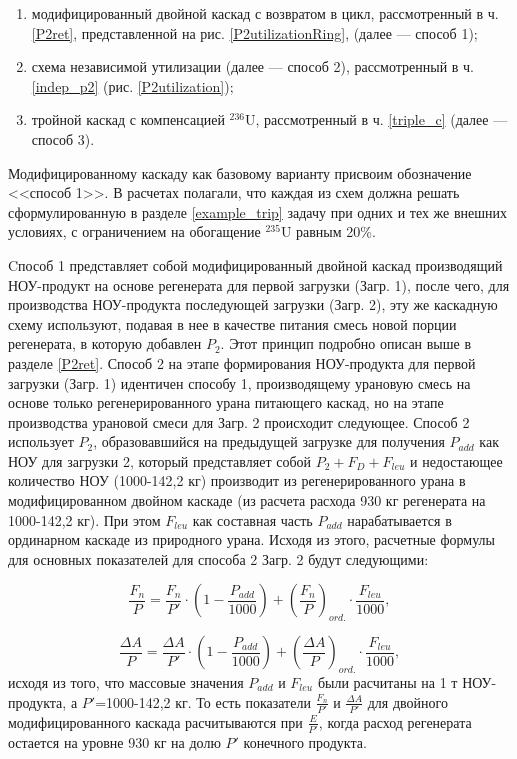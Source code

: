 \begin{enumerate}
    \item модифицированный двойной каскад с возвратом в цикл, рассмотренный в ч. \ref{P2ret}, представленной на рис. \ref{P2utilizationRing}, (далее --- способ 1);
    \item схема независимой утилизации (далее --- способ 2), рассмотренный в ч. \ref{indep_p2} (рис. \ref{P2utilization});
    \item тройной каскад с компенсацией $^{236}$U, рассмотренный в ч. \ref{triple_c} (далее --- способ 3).
\end{enumerate}

Модифицированному каскаду как базовому варианту присвоим обозначение <<способ 1>>. В расчетах полагали, что каждая из схем должна решать сформулированную в разделе \ref{example_trip} задачу при одних и тех же внешних условиях, с ограничением на обогащение $^{235}$U равным 20\%.

Cпособ 1 представляет собой модифицированный двойной каскад производящий НОУ-продукт на основе регенерата для первой загрузки (Загр. 1), после чего, для производства НОУ-продукта последующей загрузки (Загр. 2), эту же каскадную схему используют, подавая в нее в качестве питания смесь новой порции регенерата, в которую добавлен $P_2$. Этот принцип подробно описан выше в разделе \ref{P2ret}. Способ 2 на этапе формирования НОУ-продукта для первой загрузки (Загр. 1) идентичен способу 1, производящему урановую смесь на основе только регенерированного урана питающего каскад, но на этапе производства урановой смеси для Загр. 2 происходит следующее. Способ 2 использует $P_2$, образовавшийся на предыдущей загрузке для получения $P_{add}$ как НОУ для загрузки 2, который представляет собой $P_2+F_D+F_{leu}$ и недостающее количество НОУ (1000-142,2 кг) производит из регенерированного урана в модифицированном двойном каскаде (из расчета расхода 930 кг регенерата на 1000-142,2 кг). При этом $F_{leu}$ как составная часть $P_{add}$ нарабатывается в ординарном каскаде из природного урана. Исходя из этого, расчетные формулы для основных показателей для способа 2 Загр. 2 будут следующими:

\begin{equation} \label{Fnu_plus} 
    \frac{F_n}{P}=\frac{F_n}{P'}\cdot (1 - \frac{P_{add}}{1000}) + (\frac{F_n}{P})_{ord.}\cdot \frac{F_{leu}}{1000},
\end{equation} 

\begin{equation} \label{AvsP_plus} 
    \frac{\Delta A}{P}=\frac{\Delta A}{P'}\cdot (1 - \frac{P_{add}}{1000}) + (\frac{\Delta A}{P})_{ord.}\cdot \frac{F_{leu}}{1000},
\end{equation} 
исходя из того, что массовые значения $P_{add}$ и $F_{leu}$ были расчитаны на 1 т НОУ-продукта, а $P'$=1000-142,2 кг. То есть показатели $\frac{F_n}{P'}$ и
$\frac{\Delta A}{P'}$ для двойного модифицированного каскада расчитываются при $\frac{E}{P'}$, когда расход регенерата остается на уровне 930 кг на долю $P'$ конечного продукта.

